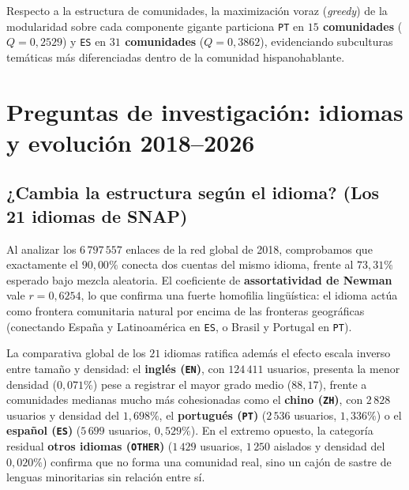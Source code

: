 \documentclass[11pt,a4paper]{article}
\begin{document}
Respecto a la estructura de comunidades, la maximización voraz (\textit{greedy}) de la modularidad sobre cada componente gigante particiona \texttt{PT} en \textbf{$15$ comunidades} ($Q = 0,2529$) y \texttt{ES} en \textbf{$31$ comunidades} ($Q = 0,3862$), evidenciando subculturas temáticas más diferenciadas dentro de la comunidad hispanohablante.

\section{Preguntas de investigación: idiomas y evolución 2018--2026}

\subsection{¿Cambia la estructura según el idioma? (Los 21 idiomas de SNAP)}
Al analizar los $6\,797\,557$ enlaces de la red global de 2018, comprobamos que exactamente el \textbf{$90,00\%$} conecta dos cuentas del mismo idioma, frente al \textbf{$73,31\%$} esperado bajo mezcla aleatoria. El coeficiente de \textbf{assortatividad de Newman}~\cite{newman2003} vale \textbf{$r = 0,6254$}, lo que confirma una fuerte homofilia lingüística: el idioma actúa como frontera comunitaria natural por encima de las fronteras geográficas (conectando España y Latinoamérica en \texttt{ES}, o Brasil y Portugal en \texttt{PT}).

La comparativa global de los $21$ idiomas ratifica además el efecto escala inverso entre tamaño y densidad: el \textbf{inglés (\texttt{EN})}, con $124\,411$ usuarios, presenta la menor densidad ($0,071\%$) pese a registrar el mayor grado medio ($88,17$), frente a comunidades medianas mucho más cohesionadas como el \textbf{chino (\texttt{ZH})}, con $2\,828$ usuarios y densidad del $1,698\%$, el \textbf{portugués (\texttt{PT})} ($2\,536$ usuarios, $1,336\%$) o el \textbf{español (\texttt{ES})} ($5\,699$ usuarios, $0,529\%$). En el extremo opuesto, la categoría residual \textbf{otros idiomas (\texttt{OTHER})} ($1\,429$ usuarios, $1\,250$ aislados y densidad del $0,020\%$) confirma que no forma una comunidad real, sino un cajón de sastre de lenguas minoritarias sin relación entre sí.
\end{document}
